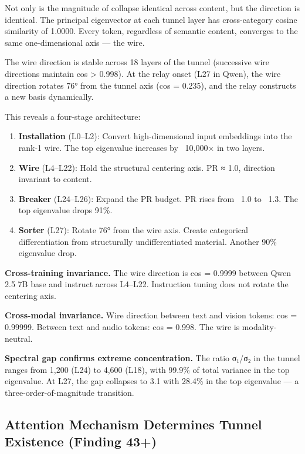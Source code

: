 \documentclass[12pt]{article}
\begin{document}
Not only is the magnitude of collapse identical across content, but the direction is identical. The principal eigenvector at each tunnel layer has cross-category cosine similarity of 1.0000. Every token, regardless of semantic content, converges to the same one-dimensional axis — the wire.

The wire direction is stable across 18 layers of the tunnel (successive wire directions maintain cos > 0.998). At the relay onset (L27 in Qwen), the wire direction rotates 76° from the tunnel axis (cos = 0.235), and the relay constructs a new basis dynamically.

This reveals a four-stage architecture:

\begin{enumerate}
\item \textbf{Installation} (L0–L2): Convert high-dimensional input embeddings into the rank-1 wire. The top eigenvalue increases by ~10,000× in two layers.
\item \textbf{Wire} (L4–L22): Hold the structural centering axis. PR ≈ 1.0, direction invariant to content.
\item \textbf{Breaker} (L24–L26): Expand the PR budget. PR rises from ~1.0 to ~1.3. The top eigenvalue drops 91\%.
\item \textbf{Sorter} (L27): Rotate 76° from the wire axis. Create categorical differentiation from structurally undifferentiated material. Another 90\% eigenvalue drop.
\end{enumerate}

\textbf{Cross-training invariance.} The wire direction is cos = 0.9999 between Qwen 2.5 7B base and instruct across L4–L22. Instruction tuning does not rotate the centering axis.

\textbf{Cross-modal invariance.} Wire direction between text and vision tokens: cos = 0.99999. Between text and audio tokens: cos = 0.998. The wire is modality-neutral.

\textbf{Spectral gap confirms extreme concentration.} The ratio σ₁/σ₂ in the tunnel ranges from 1,200 (L24) to 4,600 (L18), with 99.9\% of total variance in the top eigenvalue. At L27, the gap collapses to 3.1 with 28.4\% in the top eigenvalue — a three-order-of-magnitude transition.

\subsection{Attention Mechanism Determines Tunnel Existence (Finding 43+)}
\end{document}
